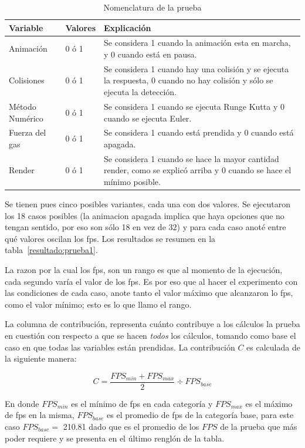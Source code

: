 \begin{table}
\begin{center}
\begin{tabular} {@{}llp{10cm}@{}}
\toprule
 Variable & Valores & Explicación\\
\midrule 
 Animación & 0 ó 1 & Se considera 1 cuando la animación esta en marcha, y 0 cuando está en pausa. \\
 Colisiones & 0 ó 1 & Se considera 1 cuando hay una colisión y se ejecuta la respuesta, 0 cuando no hay colisión y sólo se ejecuta la detección. \\
 Método Numérico & 0 ó 1 & Se considera 1 cuando se ejecuta Runge Kutta y 0 cuando se ejecuta Euler. \\
 Fuerza del gas & 0 ó 1 & Se considera 1 cuando está prendida y 0 cuando está apagada. \\
 Render & 0 ó 1 & Se considera 1 cuando se hace la mayor cantidad render, como se explicó arriba y 0 cuando se hace el mínimo posible. \\
\bottomrule
\end{tabular}
\end{center}
\caption[Explicación de la nomenclatura de la prueba del programa]{Nomenclatura de la prueba}
\label{nomenclatura:prueba}
\end{table}

Se tienen pues cinco posibles variantes, cada una con dos valores.
Se ejecutaron los 18 casos posibles (la animacion apagada implica que haya opciones que no tengan sentido, por eso son sólo 18 en vez de 32) y para cada caso anoté entre qué valores oscilan los fps. Los resultados se resumen en la tabla~\ref{resultado:prueba1}.

La razon por la cual los fps, son un rango es que al momento de la ejecución, cada segundo varía el valor de los fps.
Es por eso que al hacer el experimento con las condiciones de cada caso, anote tanto el valor máximo que alcanzaron lo fps, como el valor mínimo; esto es lo que llamo el rango.

La columna de contribución, representa cuánto contribuye a los cálculos la prueba en cuestión con respecto a que se hacen \emph{todos} los cálculos, tomando como base el caso en que todas las variables están prendidas.
La contribución $C$ es calculada de la siguiente manera:

$$ C = \frac{FPS_{min} + FPS_{max}}{2} \div FPS_{base}$$

En donde $FPS_{min}$ es el mínimo de fps en cada categoría y $FPS_{max}$ es el máximo de fps en la misma, $FPS_{base}$ es el promedio de fps de la categoría base, para este caso $FPS_{base} =$ 210.81 dado que es el promedio de los $FPS$ de la prueba que más poder requiere y se presenta en el último renglón de la tabla.

